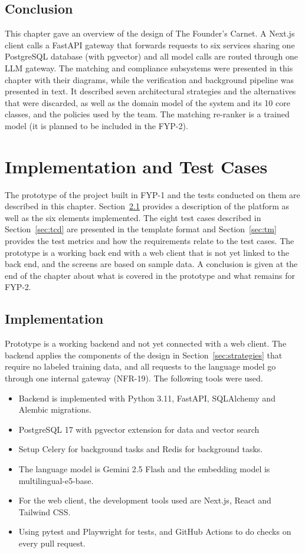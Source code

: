 \documentclass{FastFyp}
\begin{document}
\section{Conclusion}
This chapter gave an overview of the design of The Founder's Carnet. A Next.js client calls a FastAPI gateway that forwards requests to six services sharing one PostgreSQL database (with pgvector) and all model calls are routed through one LLM gateway. The matching and compliance subsystems were presented in this chapter with their diagrams, while the verification and background pipeline was presented in text. It described seven architectural strategies and the alternatives that were discarded, as well as the domain model of the system and its 10 core classes, and the policies used by the team. The matching re-ranker is a trained model (it is planned to be included in the FYP-2).

\chapter{Implementation and Test Cases}\label{ch:impl}
The prototype of the project built in FYP-1 and the tests conducted on them are described in this chapter. Section~\ref{sec:impl} provides a description of the platform as well as the six elements implemented. The eight test cases described in Section~\ref{sec:tcd} are presented in the template format and Section~\ref{sec:tm} provides the test metrics and how the requirements relate to the test cases. The prototype is a working back end with a web client that is not yet linked to the back end, and the screens are based on sample data. A conclusion is given at the end of the chapter about what is covered in the prototype and what remains for FYP-2.

\section{Implementation}\label{sec:impl}
Prototype is a working backend and not yet connected with a web client. The backend applies the components of the design in Section~\ref{sec:strategies} that require no labeled training data, and all requests to the language model go through one internal gateway (NFR-19). The following tools were used.
\begin{itemize}
\item Backend is implemented with Python 3.11, FastAPI, SQLAlchemy and Alembic migrations.
\item PostgreSQL 17 with pgvector extension for data and vector search
\item Setup Celery for background tasks and Redis for background tasks.
\item The language model is Gemini 2.5 Flash and the embedding model is multilingual-e5-base.
\item For the web client, the development tools used are Next.js, React and Tailwind CSS.
\item Using pytest and Playwright for tests, and GitHub Actions to do checks on every pull request.
\end{itemize}
\end{document}

